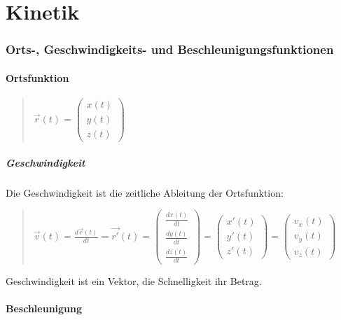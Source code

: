 
\part*{Kinetik}


\section*{Orts-, Geschwindigkeits- und Beschleunigungsfunktionen}


\subsection*{Ortsfunktion}
\begin{verse}
$\vec{r}(t)=\left(\begin{array}{c}
x(t)\\
y(t)\\
z(t)
\end{array}\right)$
\end{verse}

\subsubsection*{Geschwindigkeit}

Die Geschwindigkeit ist die zeitliche Ableitung der Ortsfunktion:
\begin{verse}
$\vec{v}(t)=\frac{d\vec{r}(t)}{dt}=\vec{r'}(t)=\left(\begin{array}{c}
\frac{dx(t)}{dt}\\
\frac{dy(t)}{dt}\\
\frac{dz(t)}{dt}
\end{array}\right)=\left(\begin{array}{c}
x'(t)\\
y'(t)\\
z'(t)
\end{array}\right)=\left(\begin{array}{c}
v_{x}(t)\\
v_{y}(t)\\
v_{z}(t)
\end{array}\right)$
\end{verse}
Geschwindigkeit ist ein Vektor, die Schnelligkeit ihr Betrag.


\subsection*{Beschleunigung}

